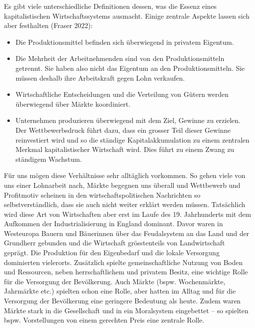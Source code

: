 \documentclass[
  nswissgerman,
  a4paper,
  DIV=11,
  numbers=noendperiod,
  oneside,
  openany]{scrreprt}
\begin{document}
Es gibt viele unterschiedliche Definitionen dessen, was die Essenz eines
kapitalistischen Wirtschaftssystems ausmacht. Einige zentrale Aspekte
lassen sich aber festhalten (Fraser 2022):

\begin{itemize}
\item
  Die Produktionsmittel befinden sich überwiegend in privatem Eigentum.
\item
  Die Mehrheit der Arbeitnehmenden sind von den Produktionsmitteln
  getrennt. Sie haben also nicht das Eigentum an den Produktionsmitteln.
  Sie müssen deshalb ihre Arbeitskraft gegen Lohn verkaufen.
\item
  Wirtschaftliche Entscheidungen und die Verteilung von Gütern werden
  überwiegend über Märkte koordiniert.
\item
  Unternehmen produzieren überwiegend mit dem Ziel, Gewinne zu erzielen.
  Der Wettbewerbsdruck führt dazu, dass ein grosser Teil dieser Gewinne
  reinvestiert wird und so die ständige Kapitalakkumulation zu einem
  zentralen Merkmal kapitalistischer Wirtschaft wird. Dies führt zu
  einem Zwang zu ständigem Wachstum.
\end{itemize}

Für uns mögen diese Verhältnisse sehr alltäglich vorkommen. So gehen
viele von uns einer Lohnarbeit nach, Märkte begegnen uns überall und
Wettbewerb und Profitmotiv scheinen in den wirtschaftspolitischen
Nachrichten so selbstverständlich, dass sie auch nicht weiter erklärt
werden müssen. Tatsächlich wird diese Art von Wirtschaften aber erst im
Laufe des 19. Jahrhunderts mit dem Aufkommen der Industrialisierung in
England dominant. Davor waren in Westeuropa Bauern und Bäuerinnen über
das Feudalsystem an das Land und der Grundherr gebunden und die
Wirtschaft grösstenteils von Landwirtschaft geprägt. Die Produktion für
den Eigenbedarf und die lokale Versorgung dominierten vielerorts.
Zusätzlich spielte gemeinschaftliche Nutzung von Boden und Ressourcen,
neben herrschaftlichem und privatem Besitz, eine wichtige Rolle für die
Versorgung der Bevölkerung. Auch Märkte (bspw. Wochenmärkte, Jahrmärkte
etc.) spielten schon eine Rolle, aber hatten im Alltag und für die
Versorgung der Bevölkerung eine geringere Bedeutung als heute. Zudem
waren Märkte stark in die Gesellschaft und in ein Moralsystem
eingebettet -- so spielten bspw. Vorstellungen von einem gerechten Preis
eine zentrale Rolle.
\end{document}
